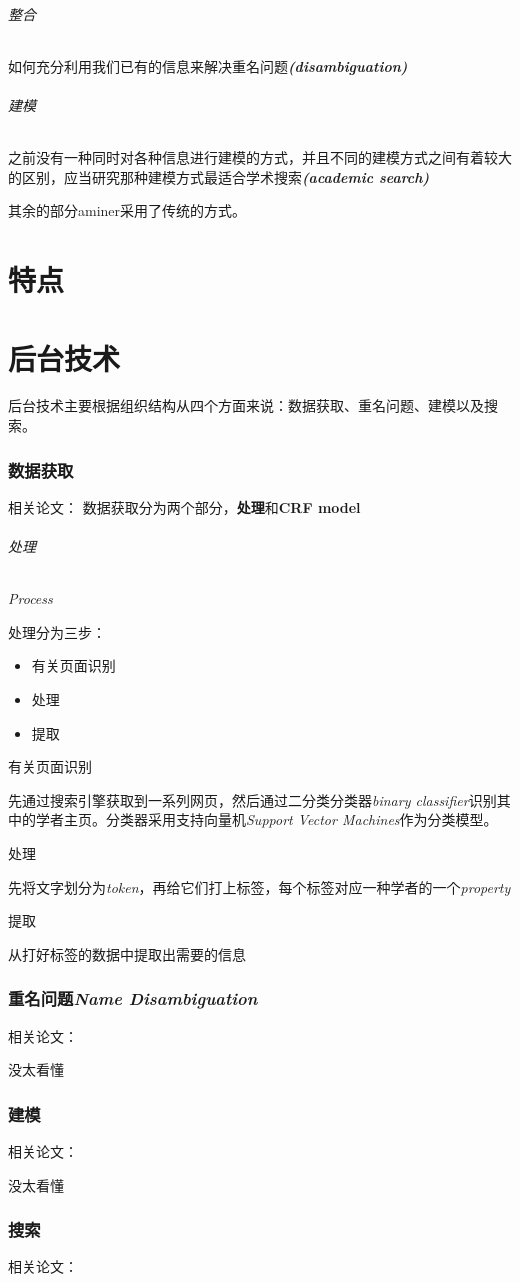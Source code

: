 \documentclass[UTF8]{ctexrep}
\begin{document}
\paragraph{整合} 如何充分利用我们已有的信息来解决重名问题\textbf{\textit{(disambiguation)}}

\paragraph{建模} 之前没有一种同时对各种信息进行建模的方式，并且不同的建模方式之间有着较大的区别，应当研究那种建模方式最适合学术搜索\textbf{\textit{(academic search)}}

\par 其余的部分aminer采用了传统的方式。




\part{特点}

\part{后台技术}
后台技术主要根据组织结构从四个方面来说：数据获取、重名问题、建模以及搜索。

\section{数据获取}
相关论文：\cite{tang2008arnetminer}
数据获取分为两个部分，\textbf{处理}和\textbf{CRF model}

\paragraph{处理}\textit{Process}
\par 处理分为三步：
\begin{itemize}
    \item 有关页面识别
    \item 处理
    \item 提取
\end{itemize}
\subparagraph{有关页面识别}先通过搜索引擎获取到一系列网页，然后通过二分类分类器\textit{binary classifier}识别其中的学者主页。分类器采用支持向量机\textit{Support Vector Machines}作为分类模型。
\subparagraph{处理}先将文字划分为\textit{token}，再给它们打上标签，每个标签对应一种学者的一个\textit{property}
\subparagraph{提取}从打好标签的数据中提取出需要的信息


\section{重名问题\textit{Name Disambiguation}}
相关论文：\cite{tang2008arnetminer}

没太看懂

\section{建模}
相关论文：\cite{tang2008arnetminer,tang2008topic}

没太看懂

\section{搜索}
相关论文：\cite{tang2008arnetminer,zhang2007constraint,tang2011unified,wang2011adana,zhang2018name}


\end{document}
